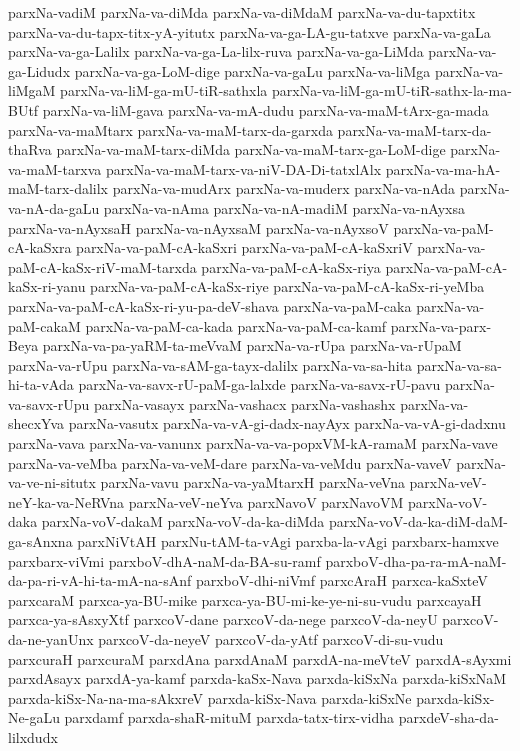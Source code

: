 {parxNa-vadiM
parxNa-va-diMda
parxNa-va-diMdaM
parxNa-va-du-tapxtitx
parxNa-va-du-tapx-titx-yA-yitutx
parxNa-va-ga-LA-gu-tatxve
parxNa-va-gaLa
parxNa-va-ga-Lalilx
parxNa-va-ga-La-lilx-ruva
parxNa-va-ga-LiMda
parxNa-va-ga-Lidudx
parxNa-va-ga-LoM-dige
parxNa-va-gaLu
parxNa-va-liMga
parxNa-va-liMgaM
parxNa-va-liM-ga-mU-tiR-sathxla
parxNa-va-liM-ga-mU-tiR-sathx-la-ma-BUtf
parxNa-va-liM-gava
parxNa-va-mA-dudu
parxNa-va-maM-tArx-ga-mada
parxNa-va-maMtarx
parxNa-va-maM-tarx-da-garxda
parxNa-va-maM-tarx-da-thaRva
parxNa-va-maM-tarx-diMda
parxNa-va-maM-tarx-ga-LoM-dige
parxNa-va-maM-tarxva
parxNa-va-maM-tarx-va-niV-DA-Di-tatxlAlx
parxNa-va-ma-hA-maM-tarx-dalilx
parxNa-va-mudArx
parxNa-va-muderx
parxNa-va-nAda
parxNa-va-nA-da-gaLu
parxNa-va-nAma
parxNa-va-nA-madiM
parxNa-va-nAyxsa
parxNa-va-nAyxsaH
parxNa-va-nAyxsaM
parxNa-va-nAyxsoV
parxNa-va-paM-cA-kaSxra
parxNa-va-paM-cA-kaSxri
parxNa-va-paM-cA-kaSxriV
parxNa-va-paM-cA-kaSx-riV-maM-tarxda
parxNa-va-paM-cA-kaSx-riya
parxNa-va-paM-cA-kaSx-ri-yanu
parxNa-va-paM-cA-kaSx-riye
parxNa-va-paM-cA-kaSx-ri-yeMba
parxNa-va-paM-cA-kaSx-ri-yu-pa-deV-shava
parxNa-va-paM-caka
parxNa-va-paM-cakaM
parxNa-va-paM-ca-kada
parxNa-va-paM-ca-kamf
parxNa-va-parx-Beya
parxNa-va-pa-yaRM-ta-meVvaM
parxNa-va-rUpa
parxNa-va-rUpaM
parxNa-va-rUpu
parxNa-va-sAM-ga-tayx-dalilx
parxNa-va-sa-hita
parxNa-va-sa-hi-ta-vAda
parxNa-va-savx-rU-paM-ga-lalxde
parxNa-va-savx-rU-pavu
parxNa-va-savx-rUpu
parxNa-vasayx
parxNa-vashacx
parxNa-vashashx
parxNa-va-shecxYva
parxNa-vasutx
parxNa-va-vA-gi-dadx-nayAyx
parxNa-va-vA-gi-dadxnu
parxNa-vava
parxNa-va-vanunx
parxNa-va-va-popxVM-kA-ramaM
parxNa-vave
parxNa-va-veMba
parxNa-va-veM-dare
parxNa-va-veMdu
parxNa-vaveV
parxNa-va-ve-ni-situtx
parxNa-vavu
parxNa-va-yaMtarxH
parxNa-veVna
parxNa-veV-neY-ka-va-NeRVna
parxNa-veV-neYva
parxNavoV
parxNavoVM
parxNa-voV-daka
parxNa-voV-dakaM
parxNa-voV-da-ka-diMda
parxNa-voV-da-ka-diM-daM-ga-sAnxna
parxNiVtAH
parxNu-tAM-ta-vAgi
parxba-la-vAgi
parxbarx-hamxve
parxbarx-viVmi
parxboV-dhA-naM-da-BA-su-ramf
parxboV-dha-pa-ra-mA-naM-da-pa-ri-vA-hi-ta-mA-na-sAnf
parxboV-dhi-niVmf
parxcAraH
parxca-kaSxteV
parxcaraM
parxca-ya-BU-mike
parxca-ya-BU-mi-ke-ye-ni-su-vudu
parxcayaH
parxca-ya-sAsxyXtf
parxcoV-dane
parxcoV-da-nege
parxcoV-da-neyU
parxcoV-da-ne-yanUnx
parxcoV-da-neyeV
parxcoV-da-yAtf
parxcoV-di-su-vudu
parxcuraH
parxcuraM
parxdAna
parxdAnaM
parxdA-na-meVteV
parxdA-sAyxmi
parxdAsayx
parxdA-ya-kamf
parxda-kaSx-Nava
parxda-kiSxNa
parxda-kiSxNaM
parxda-kiSx-Na-na-ma-sAkxreV
parxda-kiSx-Nava
parxda-kiSxNe
parxda-kiSx-Ne-gaLu
parxdamf
parxda-shaR-mituM
parxda-tatx-tirx-vidha
parxdeV-sha-da-lilxdudx
}

